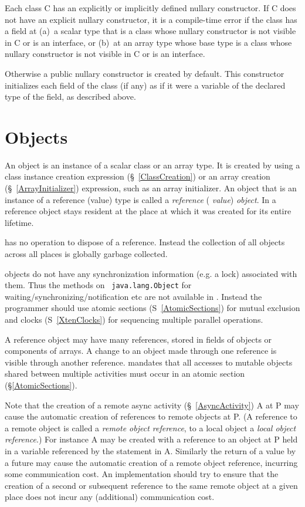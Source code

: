 Each class {\cf C} has an explicitly or implicitly defined nullary
constructor. If {\cf C} does not have an explicit nullary
constructor, it is a compile-time error if the class has a field at (a)~a
scalar type that is a {\cf class} whose nullary constructor is not
visible in {\cf C} or is an {\cf interface}, or (b)~at an array type whose
base type is a {\cf class} whose nullary constructor is not visible in
{\cf C} or is an {\cf interface}.

Otherwise a {\cf public} nullary constructor is created by
default. This constructor initializes each field of the class (if any)
as if it were a variable of the declared type of the field, as
described above.



\section{Objects}\label{XtenObjects}

An object is an instance of a scalar class or an array type. It is
created by using a class instance creation expression
(\S~\ref{ClassCreation}) or an array creation (\S~\ref{ArrayInitializer})
expression, such as an array initializer. An object that is an
instance of a reference (value) type is called a {\em reference} ({\em
value}) {\em object}. In \XtenCurrVer{} a reference object stays
resident at the place at which it was created for its entire lifetime.

{}\Xten{} has no operation to dispose of a reference.  Instead the
collection of all objects across all places is globally garbage
collected.

{}\Xten{} objects do not have any synchronization information (e.g.{}
a lock) associated with them. Thus the methods on {\tt
java.lang.Object} for waiting/synchronizing/notification etc are not
available in \Xten. Instead the programmer should use atomic sections
(S~\ref{AtomicSections}) for mutual exclusion and clocks
(S~\ref{XtenClocks}) for sequencing multiple parallel operations.

A reference object may have many references, stored in fields of
objects or components of arrays. A change to an object made through
one reference is visible through another reference. \Xten{} mandates
that all accesses to mutable objects shared between multiple
activities must occur in an atomic section (\S\ref{AtomicSections}).

Note that the creation of a remote async activity
(\S~\ref{AsyncActivity}) {\cf A} at {\cf P} may cause the automatic creation of
references to remote objects at {\cf P}. (A reference to a remote
object is called a {\em remote object reference}, to a local object a
{\em local object reference}.)  For instance {\cf A} may be created
with a reference to an object at {\cf P} held in a variable referenced
by the statement in {\cf A}.  Similarly the return of a value by a
{\cf future} may cause the automatic creation of a remote object
reference, incurring some communication cost.  An {}\Xten{}
implementation should try to ensure that the creation of a second or
subsequent reference to the same remote object at a given place does
not incur any (additional) communication cost.

